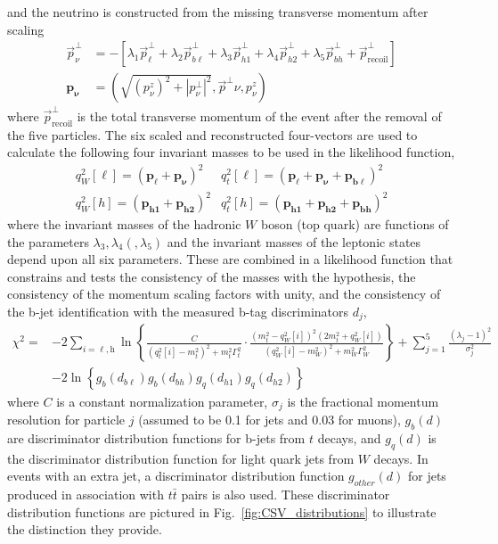 \documentclass{cmspaperpdf}
\begin{document}
and the neutrino is constructed from the missing transverse momentum after scaling
\begin{align}
\vec p^\perp_\nu &= -\left[\lambda_1 \vec p^\perp_\ell + \lambda_2\vec p^\perp_{b\ell}+ \lambda_3\vec p^\perp_{h1}
+ \lambda_4\vec p^\perp_{h2}+ \lambda_5\vec p^\perp_{bh} + \vec p^\perp_\mathrm{recoil}\right ] \nonumber \\
\boldsymbol{p_\nu} &= \left(\sqrt{(p_\nu^z)^2+|p^\perp_\nu |^2}, \vec p^\perp\nu, p_\nu^z\right)
\end{align}
where $\vec p^\perp_\mathrm{recoil}$ is the total transverse momentum of the event after the removal of the five particles.  The six scaled and reconstructed four-vectors are used to calculate the following four invariant masses to be used in the likelihood function,
\begin{equation}
\begin{array} {ll}
q_W^2[\ell] = \left(\boldsymbol{p_\ell}+\boldsymbol{p_\nu}\right)^2 & q_t^2[\ell] = \left(\boldsymbol{p_\ell}+\boldsymbol{p_\nu}+\boldsymbol{p_{b\ell}}\right)^2  \\
q_W^2[h] = \left(\boldsymbol{p_{h1}}+\boldsymbol{p_{h2}}\right)^2 & q_t^2[h] = \left(\boldsymbol{p_{h1}}+\boldsymbol{p_{h2}}+\boldsymbol{p_{bh}}\right)^2 
\end{array}
\end{equation}
where the invariant masses of the hadronic $W$ boson (top quark) are functions of the parameters $\lambda_3,\lambda_4(,\lambda_5)$ and the invariant masses of the leptonic states depend upon all six parameters.  These are combined in a likelihood function that constrains and tests the consistency of the masses with the hypothesis, the consistency of the momentum scaling factors with unity, and the consistency of the b-jet identification with the measured b-tag discriminators $d_j$,
\begin{align}
\chi^2 =& -2\sum_{i=\ell,\mathrm{h}}\ln\left\lbrace\frac{C}{(q_t^2[i]-m_t^2)^2+m_t^2\Gamma_t^2}\cdot\frac{(m_t^2-q_W^2[i])^2(2m_t^2+q_W^2[i])}{(q_W^2[i]-m_W^2)^2+m_W^2\Gamma_W^2}\right\rbrace + \sum_{j=1}^5\frac{(\lambda_j-1)^2}{\sigma_j^2} \nonumber \\
& -2\ln\left\{g_{b}(d_{b\ell})g_{b}(d_{bh})g_{q}(d_{h1})g_{q}(d_{h2})\right\}
\end{align}
where $C$ is a constant normalization parameter, $\sigma_j$ is the fractional momentum resolution for particle $j$ (assumed to be 0.1 for jets and 0.03 for muons), $g_{b}(d)$ are discriminator distribution functions for b-jets from $t$ decays, and $g_{q}(d)$ is the discriminator distribution function for light quark jets from $W$ decays.  In events with an extra jet, a discriminator distribution function $g_{other}(d)$ for jets produced in association with $t\bar{t}$ pairs is also used. These discriminator distribution functions are pictured in Fig.~\ref{fig:CSV_distributions} to illustrate the distinction they provide. 
\end{document}
